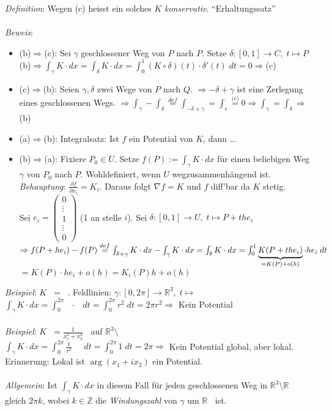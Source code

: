 \documentclass[12pt,a4paper,titlepage]{article}
\renewcommand{\arg}{\operatorname{arg}}
\renewcommand{\d}{\partial}
\newcommand{\setR}{\mathbb{R}}
\newcommand{\setZ}{\mathbb{Z}}
\newcommand{\threevec}[3]{\mathop{\left(\substack{#1 \\ #2 \\ #3}\right)}}
\begin{document}
\textit{Definition}: Wegen (c) heisst ein solches $K$ \emph{konservativ}. ``Erhaltungssatz'' \\
\\
\textit{Beweis}: \begin{itemize}
\item (b)$\Rightarrow$(c): Sei $\gamma$ geschlossener Weg von $P$ nach $P$. Setze $\delta:[0,1]\to C, \;t\mapsto P$ \\
  (b)$\Rightarrow \int_\gamma K\cdot dx=\int_\delta K\cdot dx=\int_0^1(K\circ\delta)(t)\cdot\delta'(t) \;dt=0 \Rightarrow$(c)
\item (c)$\Rightarrow$(b): Seien $\gamma,\delta$ zwei Wege von $P$ nach $Q$. $\Rightarrow -\delta+\gamma$ ist eine Zerlegung eines geschlossenen Wegs. $\Rightarrow \int_\gamma-\int_\delta\overset{def}{=}\int_{-\delta+\gamma}=\int_\epsilon\overset{\text{(c)}}{=}0 \Rightarrow \int_\gamma=\int_\delta \Rightarrow$ (b)
\item (a)$\Rightarrow$(b): Integralsatz: Ist $f$ ein Potential von $K$, dann ...
\item (b)$\Rightarrow$(a): Fixiere $P_0\in U$. Setze $f(P):=\int_\gamma K\cdot dx$ für einen beliebigen Weg $\gamma$ von $P_0$ nach $P$. Wohldefiniert, wenn $U$ wegzusammenhängend ist. \textit{Behauptung}: $\frac{\d f}{\d x_i}=K_i$. Daraus folgt $\nabla f=K$ und $f$ diff'bar da $K$ stetig. \\
  Sei $e_i=\left(\substack{0 \\ \vdots \\ 1 \\ \vdots \\ 0}\right)$ (1 an stelle $i$). Sei $\delta:[0,1]\to U, \;t\mapsto P+the_i $ \\
  $\Rightarrow f(P+he_i)-f(P)\overset{def}{=}\int_{\delta+\gamma}K\cdot dx-\int_\gamma K\cdot dx=\int_\delta K\cdot dx = \int_0^1\underbrace{K(P+the_i)}_{\mathclap{=K(P)+o(h)}}\cdot he_i \;dt$ \\
  $=K(P)\cdot he_i+o(h) = K_i(P)h+o(h)$
\end{itemize}
\textit{Beispiel}: $K\threevec{x_1}{x_2}{x_3}=\threevec{-x_2}{x_1}{0}$. Feldlinien: $\gamma:[0,2\pi]\to\setR^3, \;t\mapsto\threevec{r\cos t}{r\sin t}{z}$ \\
$\int_\gamma K\cdot dx=\int_0^{2\pi}\threevec{-r\sin t}{r\cos t}{0}\cdot\threevec{-r\sin t}{r\cos t}{0} \;dt = \int_0^{2\pi}r^2 \;dt=2\pi r^2 \Rightarrow $ Kein Potential \\
\\
\textit{Beispiel}: $K\threevec{x_1}{x_2}{x_3}=\frac{1}{x_1^2+x_2^2}\threevec{-x_2}{x_1}{0}$ auf $\setR^3{\setminus\threevec{0}{0}{*}}$\\
$\int_\gamma K\cdot dx=\int_0^{2\pi}\frac{1}{r^2}\threevec{-r\sin t}{r\cos t}{0}\threevec{-r\sin t}{r\cos t}{0} \;dt = \int_0^{2\pi}1 \;dt=2\pi \Rightarrow$ Kein Potential global, aber lokal.\\
Erinnerung: Lokal ist $\arg(x_1+ix_2)$ ein Potential. \\
\\
\textit{Allgemein}: Ist $\int_\gamma K\cdot dx$ in diesem Fall für jeden geschlossenen Weg in $\setR^3\setminus\setR\threevec{0}{0}{1}$ gleich $2\pi k$, wobei $k\in\setZ$ die \emph{Windungszahl} von $\gamma$ um $\setR\threevec{0}{0}{1}$ ist.
\end{document}
